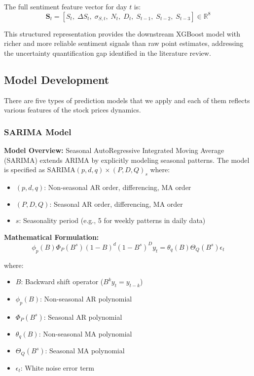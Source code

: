 \vspace{0.5cm}
\noindent The full sentiment feature vector for day $t$ is:
\begin{equation}
\mathbf{S}_t = \left[S_t,\; \Delta S_t,\; \sigma_{S,t},\; N_t,\; D_t,\; S_{t-1},\; S_{t-2},\; S_{t-3}\right] \in \mathbb{R}^8
\end{equation}

This structured representation provides the downstream XGBoost model with richer and more reliable sentiment signals than raw point estimates, addressing the uncertainty quantification gap identified in the literature review.

\subsection{Model Development}

There are five types of prediction models that we apply and each of them reflects various features of the stock prices dynamics.

\subsubsection{SARIMA Model}

\textbf{Model Overview:}
Seasonal AutoRegressive Integrated Moving Average (SARIMA) extends ARIMA by explicitly modeling seasonal patterns. The model is specified as SARIMA$(p, d, q) \times (P, D, Q)_s$ where:

\begin{itemize}
    \item $(p, d, q)$: Non-seasonal AR order, differencing, MA order
    \item $(P, D, Q)$: Seasonal AR order, differencing, MA order
    \item $s$: Seasonality period (e.g., 5 for weekly patterns in daily data)
\end{itemize}

\textbf{Mathematical Formulation:}
\begin{equation}
\phi_p(B)\Phi_P(B^s)(1-B)^d(1-B^s)^D y_t = \theta_q(B)\Theta_Q(B^s)\epsilon_t
\end{equation}

where:
\begin{itemize}
    \item $B$: Backward shift operator ($B^k y_t = y_{t-k}$)
    \item $\phi_p(B)$: Non-seasonal AR polynomial
    \item $\Phi_P(B^s)$: Seasonal AR polynomial
    \item $\theta_q(B)$: Non-seasonal MA polynomial
    \item $\Theta_Q(B^s)$: Seasonal MA polynomial
    \item $\epsilon_t$: White noise error term
\end{itemize}

